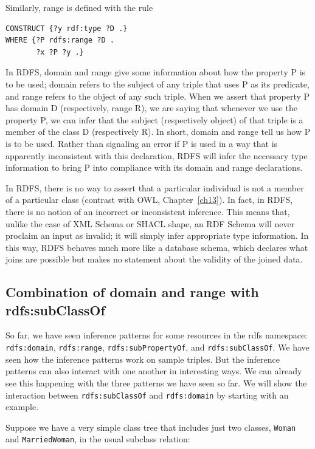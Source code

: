 Similarly, range is defined with the rule

\begin{lstlisting}
CONSTRUCT {?y rdf:type ?D .}
WHERE {?P rdfs:range ?D .
       ?x ?P ?y .}
\end{lstlisting}

In RDFS, domain and range give some information about how the property P
is to be used; domain refers to the subject of any triple that uses P as
its predicate, and range refers to the object of any such triple. When
we assert that property P has domain D (respectively, range R), we are
saying that whenever we use the property P, we can infer that the
subject (respectively object) of that triple is
a member of the class D (respectively R). In short, domain and range
tell us how P is to be used. Rather than signaling an error if P is used
in a way that is apparently inconsistent with this declaration, RDFS
will infer the necessary type information to bring P into compliance
with its domain and range declarations.

In RDFS, there is no way to assert that a particular individual is not a
member of a particular class (contrast with OWL, Chapter~\ref{ch13}). In fact,
in RDFS, there is no notion of an incorrect or inconsistent inference.
This means that, unlike the case of XML Schema or SHACL shape, an RDF
Schema will never proclaim an input as invalid; it will simply infer
appropriate type information. In this way, RDFS behaves much more like a
database schema, which declares what joins are possible but makes no
statement about the validity of the joined data.

\subsection{Combination of domain and range with rdfs:subClassOf}

So far, we have seen inference patterns for some resources in the rdfs
namespace: \texttt{rdfs:domain}, \texttt{rdfs:range}, \texttt{rdfs:subPropertyOf}, and
\texttt{rdfs:subClassOf}. We have seen how the inference patterns work on sample
triples. But the inference patterns can also interact with one another
in interesting ways. We can already see this happening with the three
patterns we have seen so far. We will show the interaction between
\texttt{rdfs:subClassOf} and \texttt{rdfs:domain} by starting with an example.

Suppose we have a very simple class tree that includes just two classes,
\texttt{Woman} and \texttt{MarriedWoman}, in the usual subclass relation:


